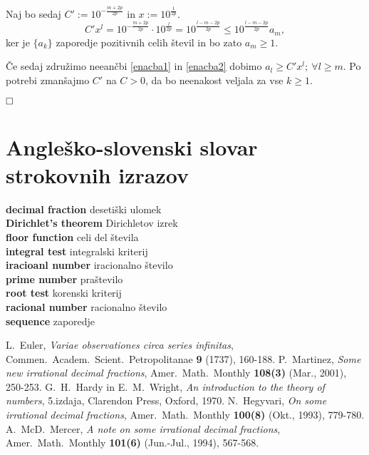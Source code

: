 \documentclass[a4paper,12pt]{article}
\newcommand{\geslo}[2]{\noindent\textbf{#1} \quad \hangindent=1cm #2\\[-1pc]}
\def\qed{$\hfill\Box$}   %
\begin{document}
Naj bo sedaj $C' := 10^{-\frac{m + 2p}{2p}}$ in $x := 10^{\frac{1}{2p}}$.
\begin{equation}\label{enacba2}
     C'x^l = 10^{-\frac{m + 2p}{2p}} \cdot 10^{\frac{l}{2p}} = 10 ^{\frac{l-m-2p}{2p}}
     \leq 10 ^{\frac{l-m-2p}{2p}} a_m,
\end{equation}
ker je $\{a_k\}$ zaporedje pozitivnih celih števil in bo zato $a_m \geq 1$.

Če sedaj združimo neeančbi \ref{enacba1} in \ref{enacba2} dobimo 
$a_l \geq C'x^l; \ \forall l \geq m$.
Po potrebi zmanšajmo $C'$ na $C>0$, da bo neenakost veljala
za vse $k \geq 1$.

\qed

\section*{Angleško-slovenski slovar strokovnih izrazov}

\geslo{decimal fraction}{desetiški ulomek}

\geslo{Dirichlet's theorem}{Dirichletov izrek}

\geslo{floor function}{celi del števila}

\geslo{integral test}{integralski kriterij}

\geslo{iracioanl number}{iracionalno število}

\geslo{prime number}{praštevilo}

\geslo{root test}{korenski kriterij}

\geslo{racional number}{racionalno število}

\geslo{sequence}{zaporedje}

\begin{thebibliography}{1}
    L.~Euler, \emph{Variae observationes circa series infinitas},
    Commen.~Academ.~Scient.~Petropolitanae \textbf{9} (1737), 160-188.
    P.~Martinez, \emph{Some new irrational decimal fractions},
    Amer.~Math.~Monthly \textbf{108(3)}  (Mar., 2001),  250-253.
    G.~H.~Hardy in E.~M.~Wright, \emph{An introduction to the theory of numbers}, 
    5.izdaja, Clarendon Press, Oxford, 1970.
    N.~Hegyvari, \emph{On some irrational decimal fractions},
    Amer.~Math.~Monthly \textbf{100(8)}  (Okt., 1993),  779-780.
    A.~McD.~Mercer, \emph{A note on some irrational decimal fractions},
    Amer.~Math.~Monthly \textbf{101(6)}  (Jun.-Jul., 1994),  567-568.
    
\end{thebibliography}
\end{document}
